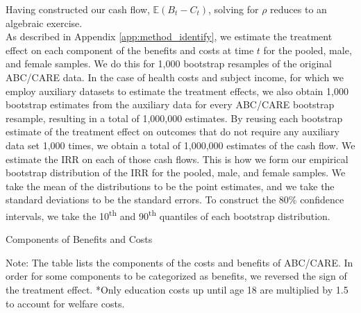 \noindent Having constructed our cash flow, $\mathbb{E} (B_t - C_t)$, solving for $\rho$
reduces to an algebraic exercise. \\

\noindent As described in Appendix \ref{app:method_identify}, we estimate the treatment effect on each
component of the benefits and costs at time $t$ for the pooled, male, and
female samples. We do this for 1,000 bootstrap resamples of the original ABC/CARE data.
In the case of health costs and subject income, for which we employ auxiliary datasets to
estimate the treatment effects, we also obtain 1,000 bootstrap estimates from the auxiliary data
for every ABC/CARE bootstrap resample, resulting in a total of 1,000,000 estimates.
By reusing each bootstrap estimate of the treatment effect on outcomes that do not require any auxiliary data
set 1,000 times, we obtain a total of 1,000,000 estimates of the cash flow.
We estimate the IRR on each of those cash flows.
This is how we form our empirical bootstrap distribution of the IRR for the pooled, male, and female samples.
We take the mean of the distributions to be the point estimates, and we take the standard deviations
to be the standard errors. To construct the 80\% confidence intervals, we take the 10\textsuperscript{th}
and 90\textsuperscript{th} quantiles of each bootstrap distribution. \\


\begin{table}[H]
\begin{threeparttable}
\caption{Components of Benefits and Costs}
\label{table:bc_comp}
\centering

\begin{tablenotes}
\tiny
\item Note: The table lists the components of the costs and benefits of ABC/CARE.
In order for some components to be categorized as benefits, we reversed the sign
of the treatment effect. *Only education costs up until age 18 are multiplied by 1.5 to account for welfare costs.
\end{tablenotes}
\end{threeparttable}
\end{table}






